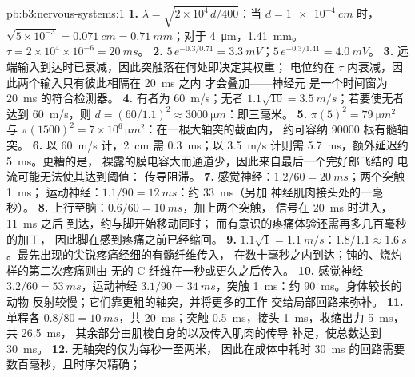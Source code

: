 \begin{solution}{pb:b3:nervous-systems:1}
\textbf{1.} $\lambda = \sqrt{2\times 10^{4}\,d/400}$：当 $d =
\qty{1e-4}{cm}$ 时，$\sqrt{5\times 10^{-3}} = \qty{0.071}{cm} =
\qty{0.71}{mm}$；对于 \qty{4}{\micro m}，\qty{1.41}{mm}。$\tau = 2\times
10^{4}\times 10^{-6} = \qty{20}{ms}$。
\textbf{2.} $5\,e^{-0.3/0.71} = \qty{3.3}{mV}$；$5\,e^{-0.3/1.41} =
\qty{4.0}{mV}$。
\textbf{3.} 远端输入到达时已衰减，因此突触落在何处即决定其权重；
电位约在 $\tau$ 内衰减，因此两个输入只有彼此相隔在 \qty{20}{ms} 之内
才会叠加——神经元
是一个时间窗为 \qty{20}{ms} 的符合检测器。
\textbf{4.} 有者为 \qty{60}{m/s}；无者 $1.1\sqrt{10} =
\qty{3.5}{m/s}$；若要使无者达到 \qty{60}{m/s}，则 $d = (60/1.1)^{2}
\approx \qty{3000}{\micro m}$：即三毫米。
\textbf{5.} $\pi(5)^{2} = \qty{79}{\micro m^2}$ 与 $\pi(1500)^{2} =
7\times 10^{6}\,\unit{\micro m^2}$：在一根大轴突的截面内，
约可容纳 \num{90000} 根有髓轴突。
\textbf{6.} 以 \qty{60}{m/s} 计，\qty{2}{cm} 需 \qty{0.3}{ms}；以
\qty{3.5}{m/s} 计则需 \qty{5.7}{ms}，额外延迟约 \qty{5}{ms}。更糟的是，
裸露的膜电容大而通道少，因此来自最后一个完好郎飞结的
电流可能无法使其达到阈值：
传导阻滞。
\textbf{7.} 感觉神经：$1.2/60 = \qty{20}{ms}$；两个突触 \qty{1}{ms}；
运动神经：$1.1/90 = \qty{12}{ms}$：约 \qty{33}{ms}（另加
神经肌肉接头处的一毫秒）。
\textbf{8.} 上行至脑：$0.6/60 = \qty{10}{ms}$，加上两个突触，
信号在 \qty{20}{ms} 时进入，\qty{11}{ms} 之后
到达，约与脚开始移动同时；
而有意识的疼痛体验还需再多几百毫秒的加工，
因此脚在感到疼痛之前已经缩回。
\textbf{9.} $1.1\sqrt{1} = \qty{1.1}{m/s}$：$1.8/1.1 \approx
\qty{1.6}{s}$。最先出现的尖锐疼痛经细的有髓纤维传入，
在数十毫秒之内到达；钝的、烧灼样的第二次疼痛则由
无的 C 纤维在一秒或更久之后传入。
\textbf{10.} 感觉神经 $3.2/60 = \qty{53}{ms}$，运动神经 $3.1/90 =
\qty{34}{ms}$，突触 \qty{1}{ms}：约 \qty{90}{ms}。身体较长的动物
反射较慢；它们靠更粗的轴突，并将更多的工作
交给局部回路来弥补。
\textbf{11.} 单程各 $0.8/80 = \qty{10}{ms}$，共 \qty{20}{ms}；突触
\qty{0.5}{ms}，接头 \qty{1}{ms}，收缩出力 \qty{5}{ms}，共 \qty{26.5}{ms}，
其余部分由肌梭自身的以及传入肌肉的传导
补足，使总数达到 \qty{30}{ms}。
\textbf{12.} 无轴突的仅为每秒一至两米，
因此在成体中耗时 \qty{30}{ms} 的回路需要数百毫秒，且时序欠精确；

\end{solution}
